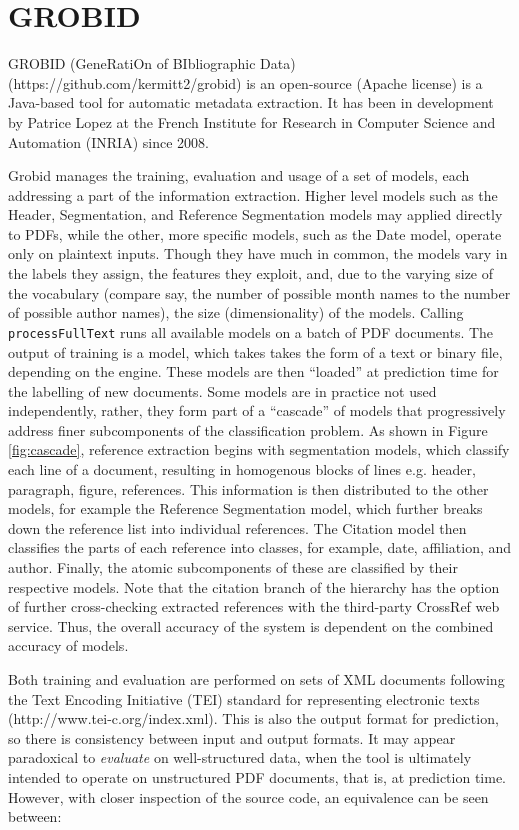 \section{GROBID}
\label{sec:grobid}
GROBID (GeneRatiOn of BIbliographic Data) (https://github.com/kermitt2/grobid) is an open-source (Apache license) is a Java-based tool for automatic metadata extraction. It has been in development by Patrice Lopez at the French Institute for Research in Computer Science and Automation (INRIA) since 2008.

Grobid manages the training, evaluation and usage of a set of models, each addressing a part of the information extraction. Higher level models such as the Header, Segmentation, and Reference Segmentation models may applied directly to PDFs, while the other, more specific models, such as the Date model, operate only on plaintext inputs. Though they have much in common, the models vary in the labels they assign, the features they exploit, and, due to the varying size of the vocabulary (compare say, the number of possible month names to the number of possible author names), the size (dimensionality) of the models. Calling \texttt{processFullText} runs all available models on a batch of PDF documents. The output of training is a model, which takes takes the form of a text or binary file, depending on the engine. These models are then ``loaded'' at prediction time for the labelling of new documents. Some models are in practice not used independently, rather, they form part of a ``cascade'' of models that progressively address finer subcomponents of the classification problem. As shown in Figure \ref{fig:cascade}, reference extraction begins with segmentation models, which classify each line of a document, resulting in homogenous blocks of lines e.g. header, paragraph, figure, references. This information is then distributed to the other models, for example the Reference Segmentation model, which further breaks down the reference list into individual references. The Citation model then classifies the parts of each reference into classes, for example, date, affiliation, and author. Finally, the atomic subcomponents of these are classified by their respective models. Note that the citation branch of the hierarchy has the option of further cross-checking extracted references with the third-party CrossRef web service. Thus, the overall accuracy of the system is dependent on the combined accuracy of models.

Both training and evaluation are performed on sets of XML documents following the Text Encoding Initiative (TEI) standard for representing electronic texts (http://www.tei-c.org/index.xml). This is also the output format for prediction, so there is consistency between input and output formats. It may appear paradoxical to \emph{evaluate} on well-structured data, when the tool is ultimately intended to operate on unstructured PDF documents, that is, at prediction time. However, with closer inspection of the source code, an equivalence can be seen between:

